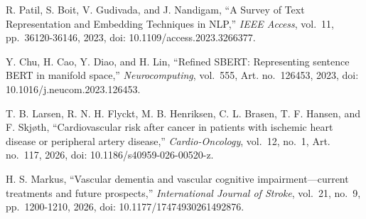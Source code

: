  R. Patil, S. Boit, V. Gudivada, and J. Nandigam, ``A Survey of Text Representation and Embedding Techniques in NLP,'' \textit{IEEE Access}, vol.~11, pp.~36120-36146, 2023, doi: 10.1109/access.2023.3266377.

 Y. Chu, H. Cao, Y. Diao, and H. Lin, ``Refined SBERT: Representing sentence BERT in manifold space,'' \textit{Neurocomputing}, vol.~555, Art. no.~126453, 2023, doi: 10.1016/j.neucom.2023.126453.

 T. B. Larsen, R. N. H. Flyckt, M. B. Henriksen, C. L. Brasen, T. F. Hansen, and F. Skjøth, ``Cardiovascular risk after cancer in patients with ischemic heart disease or peripheral artery disease,'' \textit{Cardio-Oncology}, vol.~12, no.~1, Art. no.~117, 2026, doi: 10.1186/s40959-026-00520-z.

 H. S. Markus, ``Vascular dementia and vascular cognitive impairment—current treatments and future prospects,'' \textit{International Journal of Stroke}, vol.~21, no.~9, pp.~1200-1210, 2026, doi: 10.1177/17474930261492876.

